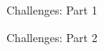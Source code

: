 \documentclass[notes, xcolor = dvipsnames]{beamer}
\begin{document}
    \begin{frame}{Challenges: Part 1}




 
    \end{frame}
    
    \begin{frame}{Challenges: Part 2}

            

    \end{frame}
\end{document}
